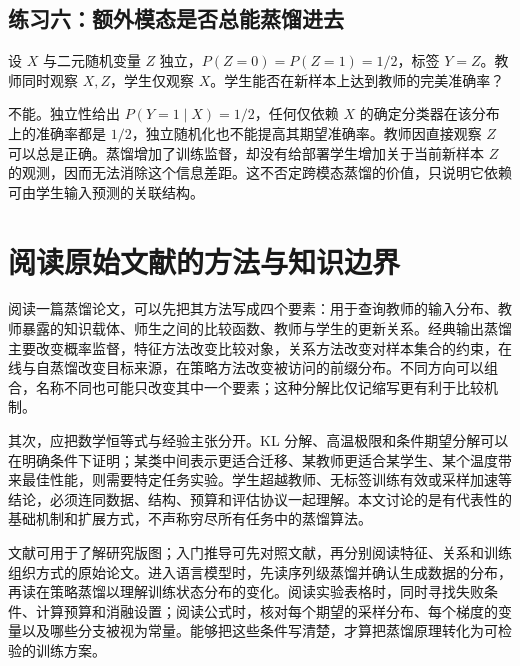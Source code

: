 \documentclass[UTF8,12pt,a4paper,fontset=fandol]{ctexart}
\begin{document}
\subsection{练习六：额外模态是否总能蒸馏进去}
设 $X$ 与二元随机变量 $Z$ 独立，$P(Z=0)=P(Z=1)=1/2$，标签 $Y=Z$。教师同时观察 $X,Z$，学生仅观察 $X$。学生能否在新样本上达到教师的完美准确率？

\begin{solve}
不能。独立性给出 $P(Y=1\mid X)=1/2$，任何仅依赖 $X$ 的确定分类器在该分布上的准确率都是 $1/2$，独立随机化也不能提高其期望准确率。教师因直接观察 $Z$ 可以总是正确。蒸馏增加了训练监督，却没有给部署学生增加关于当前新样本 $Z$ 的观测，因而无法消除这个信息差距。这不否定跨模态蒸馏的价值，只说明它依赖可由学生输入预测的关联结构。
\end{solve}

\section{阅读原始文献的方法与知识边界}
\label{sec:kd-reading}
阅读一篇蒸馏论文，可以先把其方法写成四个要素：用于查询教师的输入分布、教师暴露的知识载体、师生之间的比较函数、教师与学生的更新关系。经典输出蒸馏主要改变概率监督，特征方法改变比较对象，关系方法改变对样本集合的约束，在线与自蒸馏改变目标来源，在策略方法改变被访问的前缀分布。不同方向可以组合，名称不同也可能只改变其中一个要素；这种分解比仅记缩写更有利于比较机制。

其次，应把数学恒等式与经验主张分开。KL 分解、高温极限和条件期望分解可以在明确条件下证明；某类中间表示更适合迁移、某教师更适合某学生、某个温度带来最佳性能，则需要特定任务实验。学生超越教师、无标签训练有效或采样加速等结论，必须连同数据、结构、预算和评估协议一起理解。本文讨论的是有代表性的基础机制和扩展方式，不声称穷尽所有任务中的蒸馏算法。

文献\cite{gou2021}可用于了解研究版图；入门推导可先对照文献\cite{hinton2015}，再分别阅读特征、关系和训练组织方式的原始论文。进入语言模型时，先读序列级蒸馏\cite{kim2016}并确认生成数据的分布，再读在策略蒸馏\cite{agarwal2024}以理解训练状态分布的变化。阅读实验表格时，同时寻找失败条件、计算预算和消融设置；阅读公式时，核对每个期望的采样分布、每个梯度的变量以及哪些分支被视为常量。能够把这些条件写清楚，才算把蒸馏原理转化为可检验的训练方案。
\end{document}
